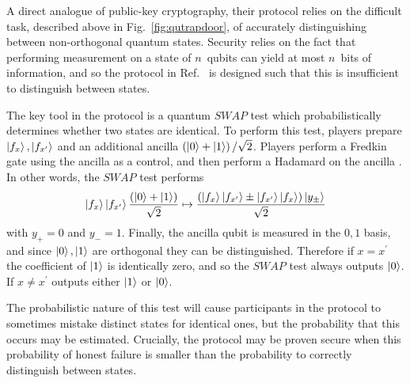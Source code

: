 A direct analogue of public-key cryptography, their protocol relies on the difficult task, described above in Fig.~\ref{fig:qutrapdoor}, of accurately distinguishing between non-orthogonal quantum states. Security relies on the fact that performing measurement on a state of $n$~qubits can yield at most $n$~bits of information, and so the protocol in Ref.~\cite{Gottesman2001} is designed such that this is insufficient to distinguish between states.

The key tool in the protocol is a quantum $SWAP$ test which probabilistically determines whether two states are identical. To perform this test, players prepare $\ket{f_x}, \ket{f_{x^\prime}}$ and an additional ancilla $\left(\ket{0} + \ket{1}\right)/\sqrt{2}$. Players perform a Fredkin gate using the ancilla as a control, and then perform a Hadamard on the ancilla \cite{Nielsen2010, brendon_book}. In other words, the $SWAP$ test performs 
\begin{equation}
\ket{f_x}\ket{f_{x^\prime}}\frac{\left(\ket{0} + \ket{1}\right)}{\sqrt{2}} \mapsto \frac{\left(\ket{f_x}\ket{f_{x^\prime}} \pm \ket{f_{x^\prime}}\ket{f_x}\right)\ket{y_{\pm}}}{\sqrt{2}}
\end{equation}
with $y_+=0$ and $y_-=1$. Finally, the ancilla qubit is measured in the $0, 1$ basis, and since $\ket{0}, \ket{1}$ are orthogonal they can be distinguished.  Therefore if $x = x^\prime$ the coefficient of $\ket{1}$ is identically zero, and so the $SWAP$ test always outputs $\ket{0}$. If $x \ne x^\prime$ outputs either $\ket{1}$ or $\ket{0}$. 

The probabilistic nature of this test will cause participants in the protocol to sometimes mistake distinct states for identical ones, but the probability that this occurs may be estimated. Crucially, the protocol may be proven secure when this probability of honest failure is smaller than the probability to correctly distinguish between states.



